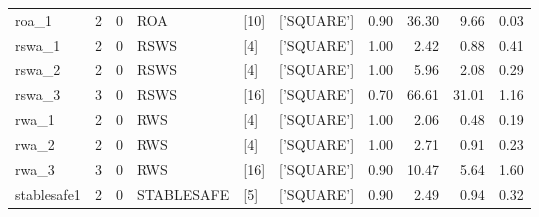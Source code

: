\begin{tabular}{llllllrrrr}
    roa\_1             & 2     & 0     & ROA         & [10]    & ['SQUARE']           & 0.90   & 36.30                   & 9.66  & 0.03   \\
    \cline{1-10} \cline{2-10} \cline{3-10} \cline{4-10} \cline{5-10}
    rswa\_1            & 2     & 0     & RSWS        & [4]     & ['SQUARE']           & 1.00   & 2.42                    & 0.88  & 0.41   \\
    \cline{1-10} \cline{2-10} \cline{3-10} \cline{4-10} \cline{5-10}
    rswa\_2            & 2     & 0     & RSWS        & [4]     & ['SQUARE']           & 1.00   & 5.96                    & 2.08  & 0.29   \\
    \cline{1-10} \cline{2-10} \cline{3-10} \cline{4-10} \cline{5-10}
    rswa\_3            & 3     & 0     & RSWS        & [16]    & ['SQUARE']           & 0.70   & 66.61                   & 31.01 & 1.16   \\
    \cline{1-10} \cline{2-10} \cline{3-10} \cline{4-10} \cline{5-10}
    rwa\_1             & 2     & 0     & RWS         & [4]     & ['SQUARE']           & 1.00   & 2.06                    & 0.48  & 0.19   \\
    \cline{1-10} \cline{2-10} \cline{3-10} \cline{4-10} \cline{5-10}
    rwa\_2             & 2     & 0     & RWS         & [4]     & ['SQUARE']           & 1.00   & 2.71                    & 0.91  & 0.23   \\
    \cline{1-10} \cline{2-10} \cline{3-10} \cline{4-10} \cline{5-10}
    rwa\_3             & 3     & 0     & RWS         & [16]    & ['SQUARE']           & 0.90   & 10.47                   & 5.64  & 1.60   \\
    \cline{1-10} \cline{2-10} \cline{3-10} \cline{4-10} \cline{5-10}
    stablesafe1        & 2     & 0     & STABLESAFE  & [5]     & ['SQUARE']           & 0.90   & 2.49                    & 0.94  & 0.32   \\
    \cline{1-10} \cline{2-10} \cline{3-10} \cline{4-10} \cline{5-10}
    \bottomrule
\end{tabular}
